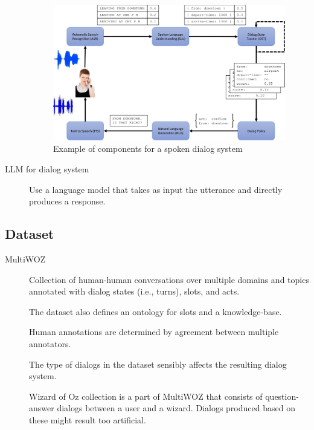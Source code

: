 \begin{description}
        \begin{figure}[H]
            \centering
            \includegraphics[width=0.85\linewidth]{./img/spoken_dialog_system.png}
            \caption{Example of components for a spoken dialog system}
        \end{figure}


    \item[LLM for dialog system] 
        Use a language model that takes as input the utterance and directly produces a response.
\end{description}


\subsection{Dataset}

\begin{description}
    \item[MultiWOZ] 
        Collection of human-human conversations over multiple domains and topics annotated with dialog states (i.e., turns), slots, and acts.

        The dataset also defines an ontology for slots and a knowledge-base.

        \begin{remark}
            Human annotations are determined by agreement between multiple annotators.
        \end{remark}

        \begin{remark}
            The type of dialogs in the dataset sensibly affects the resulting dialog system.

            \indenttbox
            \begin{example}
                Wizard of Oz collection is a part of MultiWOZ that consists of question-answer dialogs between a user and a wizard. Dialogs produced based on these might result too artificial.
            \end{example}
        \end{remark}
\end{description}



